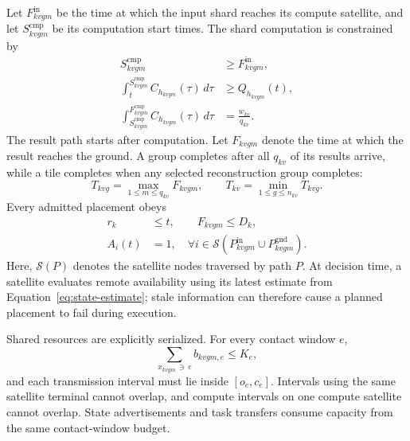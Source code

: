 \documentclass[conference]{IEEEtran}
\begin{document}
\noindent Let $F^{\mathrm{in}}_{kvgm}$ be the time at which the input shard reaches its
compute satellite, and let $S^{\mathrm{cmp}}_{kvgm}$ be its computation start times.
The shard computation is constrained by
\begin{equation}
 \begin{aligned}
 S^{\mathrm{cmp}}_{kvgm}
 &\ge F^{\mathrm{in}}_{kvgm},\\
 \int_t^{S^{\mathrm{cmp}}_{kvgm}}
 C_{h_{kvgm}}(\tau)\,d\tau
 &\ge Q_{h_{kvgm}}(t),\\
 \int_{S^{\mathrm{cmp}}_{kvgm}}^{F^{\mathrm{cmp}}_{kvgm}}
 C_{h_{kvgm}}(\tau)\,d\tau
 &=\frac{w_{kv}}{q_{kv}}.
 \end{aligned}
 \label{eq:compute-time}
\end{equation}
The result path starts after computation. Let $F_{kvgm}$ denote the time at
which the result reaches the ground. A group completes after all $q_{kv}$ of its
results arrive, while a tile completes when any selected reconstruction group
completes:
\begin{equation}
 T_{kvg}=\max_{1\le m\le q_{kv}}F_{kvgm},
 \qquad
 T_{kv}=\min_{1\le g\le n_{kv}}T_{kvg}.
 \label{eq:completion-time}
\end{equation}
Every admitted placement obeys
\begin{equation}
 \begin{aligned}
 r_k&\le t,\qquad F_{kvgm}\le D_k,\\
 A_i(t)&=1,\quad
 \forall i\in
 \mathcal{S}(P^{\mathrm{in}}_{kvgm}\cup
 P^{\mathrm{gnd}}_{kvgm}).
 \end{aligned}
 \label{eq:deadline-availability}
\end{equation}
Here, $\mathcal{S}(P)$ denotes the satellite nodes traversed by path $P$.
At decision time, a satellite evaluates remote availability using its latest
estimate from Equation~\eqref{eq:state-estimate}; stale information can
therefore cause a planned placement to fail during execution.

Shared resources are explicitly serialized. For every contact window $e$,
\begin{equation}
 \sum_{x_{kvgm}\,\ni\,e} b_{kvgm,e}\le K_e,
 \label{eq:contact-capacity}
\end{equation}
and each transmission interval must lie inside $[o_e,c_e]$. Intervals using
the same satellite terminal cannot overlap, and compute intervals on one
compute satellite cannot overlap. State advertisements and task transfers
consume capacity from the same contact-window budget.
\end{document}
